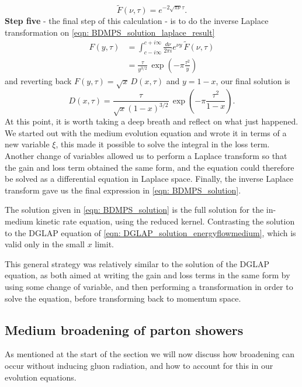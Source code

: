 \documentclass[main.tex]{subfiles}
\begin{document}
\begin{equation}\label{eqn: BDMPS_solution_laplace_result}
    \tilde{F}(\nu,\tau) = e^{-2\sqrt{\pi \nu}\tau}.
\end{equation}
\textbf{Step five} - the final step of this calculation - is to do the inverse Laplace transformation on \autoref{eqn: BDMPS_solution_laplace_result}
\begin{align}
    F(y,\tau) &= \int_{c-i\infty}^{c+i\infty} \frac{d\nu}{2\pi i} e^{\nu y} \,\tilde{F}(\nu,\tau) \nonumber \\
    &= \frac{\tau}{y^{3/2}} \, \exp\left(-\pi \frac{\tau^2}{y}\right)
\end{align}
and reverting back \(F(y,\tau) = \sqrt{x}\, D(x,\tau)\) and \(y = 1-x\), our final solution is 
\begin{equation}\label{eqn: BDMPS_solution}
    D(x,\tau ) = \frac{\tau}{\sqrt{x}(1-x)^{3/2}}\, \exp\left(-\pi \frac{\tau^2}{1-x}\right).
\end{equation}
At this point, it is worth taking a deep breath and reflect on what just happened. We started out with the medium evolution equation and wrote it in terms of a new variable \(\xi\), this made it possible to solve the integral in the loss term. Another change of variables allowed us to perform a Laplace transform so that the gain and loss term obtained the same form, and the equation could therefore be solved as a differential equation in Laplace space. Finally, the inverse Laplace transform gave us the final expression in \autoref{eqn: BDMPS_solution}.

The solution given in \autoref{eqn: BDMPS_solution} is the full solution for the in-medium kinetic rate equation, using the reduced kernel. Contrasting the solution to the DGLAP equation of \autoref{eqn: DGLAP_solution_energyflowmedium}, which is valid only in the small \(x\) limit.

This general strategy was relatively similar to the solution of the DGLAP equation, as both aimed at writing the gain and loss terms in the same form by using some change of variable, and then performing a transformation in order to solve the equation, before transforming back to momentum space.

\subsection{Medium broadening of parton showers}
As mentioned at the start of the section we will now discuss how broadening can occur without inducing gluon radiation, and how to account for this in our evolution equations.
\end{document}

